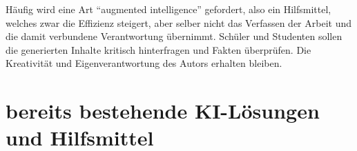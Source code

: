 \documentclass[../main.tex]{subfiles}
\begin{document}
Häufig wird eine Art "`augmented intelligence"' gefordert, also ein Hilfsmittel, welches zwar die Effizienz steigert, aber selber nicht das Verfassen der 
Arbeit und die damit verbundene Verantwortung übernimmt. Schüler und Studenten sollen die generierten Inhalte kritisch hinterfragen und Fakten überprüfen. Die Kreativität und 
Eigenverantwortung des Autors erhalten bleiben.\cite{BucherSchwarzerHolzwweißig,humanWritingToAi,teachers,ZukunftWissenschaftlichesPublizieren} 

\section{bereits bestehende KI-Lösungen und Hilfsmittel}
\end{document}
